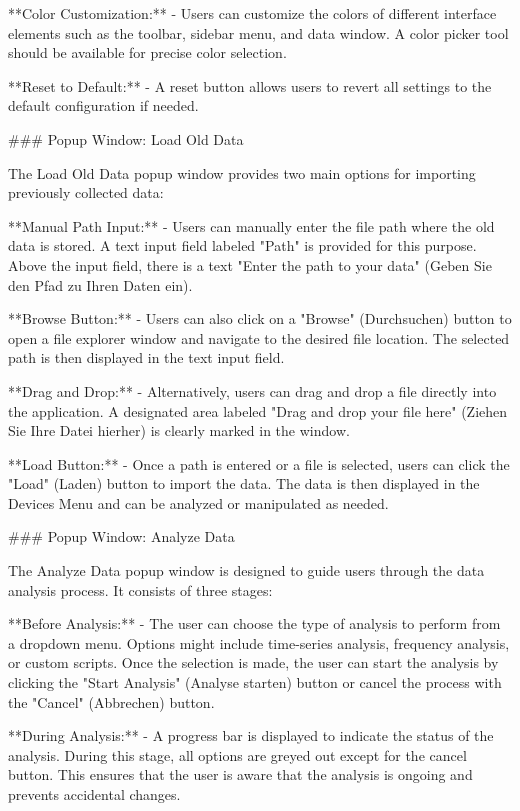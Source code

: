 \documentclass[]{scrreprt}
\begin{document}
**Color Customization:**
- Users can customize the colors of different interface elements such as the toolbar, sidebar menu, and data window. A color picker tool should be available for precise color selection.

**Reset to Default:**
- A reset button allows users to revert all settings to the default configuration if needed.

### Popup Window: Load Old Data \label{cap:PopupWindow_loadoldata}

The Load Old Data popup window provides two main options for importing previously collected data:

**Manual Path Input:**
- Users can manually enter the file path where the old data is stored. A text input field labeled "Path" is provided for this purpose. Above the input field, there is a text "Enter the path to your data" (Geben Sie den Pfad zu Ihren Daten ein).

**Browse Button:**
- Users can also click on a "Browse" (Durchsuchen) button to open a file explorer window and navigate to the desired file location. The selected path is then displayed in the text input field.

**Drag and Drop:**
- Alternatively, users can drag and drop a file directly into the application. A designated area labeled "Drag and drop your file here" (Ziehen Sie Ihre Datei hierher) is clearly marked in the window.

**Load Button:**
- Once a path is entered or a file is selected, users can click the "Load" (Laden) button to import the data. The data is then displayed in the Devices Menu and can be analyzed or manipulated as needed.

### Popup Window: Analyze Data \label{cap:PopupWindow_analysedata}

The Analyze Data popup window is designed to guide users through the data analysis process. It consists of three stages:

**Before Analysis:**
- The user can choose the type of analysis to perform from a dropdown menu. Options might include time-series analysis, frequency analysis, or custom scripts. Once the selection is made, the user can start the analysis by clicking the "Start Analysis" (Analyse starten) button or cancel the process with the "Cancel" (Abbrechen) button.

**During Analysis:**
- A progress bar is displayed to indicate the status of the analysis. During this stage, all options are greyed out except for the cancel button. This ensures that the user is aware that the analysis is ongoing and prevents accidental changes.
\end{document}
